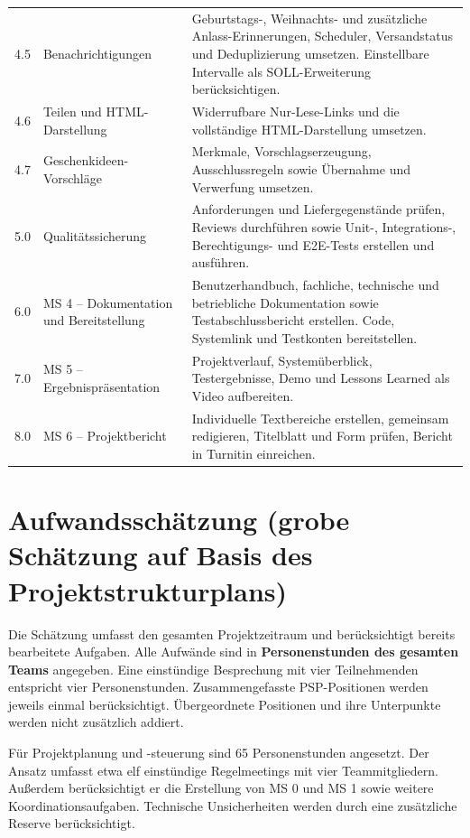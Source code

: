 \documentclass[11pt,a4paper]{article}
\begin{document}
\begin{tabularx}{\linewidth}{@{}l p{4.3cm} Y@{}}
4.5 & Benachrichtigungen & Geburtstags-, Weihnachts- und zusätzliche Anlass-Erinnerungen, Scheduler, Versandstatus und Deduplizierung umsetzen. Einstellbare Intervalle als SOLL-Erweiterung berücksichtigen. \\
4.6 & Teilen und HTML-Darstellung & Widerrufbare Nur-Lese-Links und die vollständige HTML-Darstellung umsetzen. \\
4.7 & Geschenkideen-Vorschläge & Merkmale, Vorschlagserzeugung, Ausschlussregeln sowie Übernahme und Verwerfung umsetzen. \\
5.0 & Qualitätssicherung & Anforderungen und Liefergegenstände prüfen, Reviews durchführen sowie Unit-, Integrations-, Berechtigungs- und E2E-Tests erstellen und ausführen. \\
6.0 & MS 4 – Dokumentation und Bereitstellung & Benutzerhandbuch, fachliche, technische und betriebliche Dokumentation sowie Testabschlussbericht erstellen. Code, Systemlink und Testkonten bereitstellen. \\
7.0 & MS 5 – Ergebnispräsentation & Projektverlauf, Systemüberblick, Testergebnisse, Demo und Lessons Learned als Video aufbereiten. \\
8.0 & MS 6 – Projektbericht & Individuelle Textbereiche erstellen, gemeinsam redigieren, Titelblatt und Form prüfen, Bericht in Turnitin einreichen. \\
\bottomrule
\end{tabularx}

\section{Aufwandsschätzung (grobe Schätzung auf Basis des Projektstrukturplans)}

Die Schätzung umfasst den gesamten Projektzeitraum und berücksichtigt bereits bearbeitete Aufgaben. Alle Aufwände sind in \textbf{Personenstunden des gesamten Teams} angegeben. Eine einstündige Besprechung mit vier Teilnehmenden entspricht vier Personenstunden. Zusammengefasste PSP-Positionen werden jeweils einmal berücksichtigt. Übergeordnete Positionen und ihre Unterpunkte werden nicht zusätzlich addiert.

Für Projektplanung und -steuerung sind 65 Personenstunden angesetzt. Der Ansatz umfasst etwa elf einstündige Regelmeetings mit vier Teammitgliedern. Außerdem berücksichtigt er die Erstellung von MS 0 und MS 1 sowie weitere Koordinationsaufgaben. Technische Unsicherheiten werden durch eine zusätzliche Reserve berücksichtigt.
\end{document}
